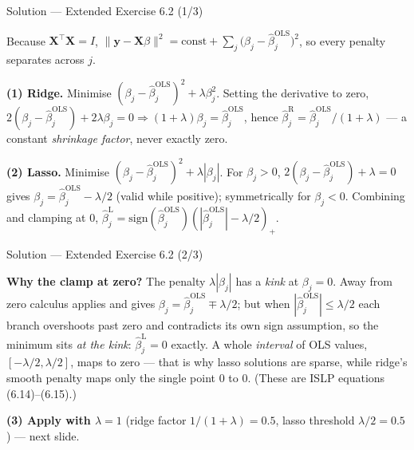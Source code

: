 \documentclass[aspectratio=169,11pt]{beamer}
\begin{document}
\begin{frame}{Solution --- Extended Exercise 6.2 (1/3)}
  \begin{solutionbox}
    Because $\mathbf{X}^\top\mathbf{X}=I$,
    $\lVert\mathbf{y}-\mathbf{X}\beta\rVert^2=\text{const}
    +\sum_j\bigl(\beta_j-\hat\beta_j^{\mathrm{OLS}}\bigr)^2$, so every
    penalty separates across $j$.

    \textbf{(1) Ridge.} Minimise
    $(\beta_j-\hat\beta_j^{\mathrm{OLS}})^2+\lambda\beta_j^2$. Setting the
    derivative to zero,
    $2(\beta_j-\hat\beta_j^{\mathrm{OLS}})+2\lambda\beta_j=0
    \Rightarrow(1+\lambda)\beta_j=\hat\beta_j^{\mathrm{OLS}}$, hence
    $\boxed{\hat\beta_j^{\mathrm R}=\hat\beta_j^{\mathrm{OLS}}/(1+\lambda)}$
    --- a constant \emph{shrinkage factor}, never exactly zero.

    \textbf{(2) Lasso.} Minimise
    $(\beta_j-\hat\beta_j^{\mathrm{OLS}})^2+\lambda|\beta_j|$. For
    $\beta_j>0$, $2(\beta_j-\hat\beta_j^{\mathrm{OLS}})+\lambda=0$ gives
    $\beta_j=\hat\beta_j^{\mathrm{OLS}}-\lambda/2$ (valid while
    positive); symmetrically for $\beta_j<0$. Combining and clamping at
    $0$,
    $\boxed{\hat\beta_j^{\mathrm L}
    =\mathrm{sign}(\hat\beta_j^{\mathrm{OLS}})
    (|\hat\beta_j^{\mathrm{OLS}}|-\lambda/2)_+}$.
  \end{solutionbox}
\end{frame}

\begin{frame}{Solution --- Extended Exercise 6.2 (2/3)}
  \begin{solutionbox}
    \textbf{Why the clamp at zero?} The penalty $\lambda|\beta_j|$ has a
    \emph{kink} at $\beta_j=0$. Away from zero calculus applies and gives
    $\beta_j=\hat\beta_j^{\mathrm{OLS}}\mp\lambda/2$; but when
    $|\hat\beta_j^{\mathrm{OLS}}|\le\lambda/2$ each branch overshoots past
    zero and contradicts its own sign assumption, so the minimum sits
    \emph{at the kink}: $\hat\beta_j^{\mathrm L}=0$ exactly. A whole
    \emph{interval} of OLS values, $[-\lambda/2,\lambda/2]$, maps to zero
    --- that is why lasso solutions are sparse, while ridge's smooth
    penalty maps only the single point $0$ to $0$.
    (These are ISLP equations (6.14)--(6.15).)

    \smallskip
    \textbf{(3) Apply with $\lambda=1$} (ridge factor
    $1/(1+\lambda)=0.5$, lasso threshold $\lambda/2=0.5$) --- next slide.
  \end{solutionbox}
\end{frame}
\end{document}
